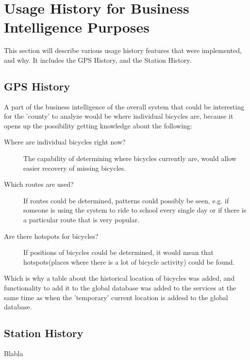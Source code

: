 \section{Usage History for Business Intelligence Purposes}
This section will describe various usage history features that were implemented, and why. It includes the GPS History, and the Station History.

\subsection{GPS History}
A part of the business intelligence of the overall system that could be interesting for the 'county' to analyze would be where individual bicycles are, because it opens up the possibility getting knowledge about the following:

\begin{description}
\item[Where are individual bicycles right now?] The capability of determining where bicycles currently are, would allow easier recovery of missing bicycles.
\item[Which routes are used?] If routes could be determined, patterns could possibly be seen, e.g. if someone is using the system to ride to school every single day or if there is a particular route that is very popular.
\item[Are there hotspots for bicycles?] If positions of bicycles could be determined, it would mean that hotspots(places where there is a lot of bicycle activity) could be found.
\end{description}

Which is why a table about the historical location of bicycles was added, and functionality to add it to the global database was added to the services at the same time as when the 'temporary' current location is addesd to the global database.

\subsection{Station History}
Blabla
